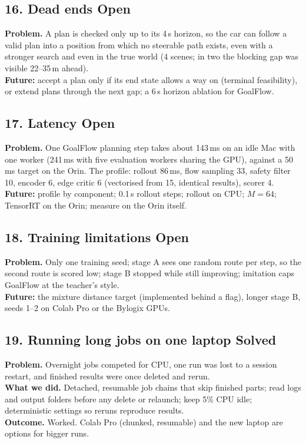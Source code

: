 \documentclass[11pt,a4paper]{article}
\newcommand{\solved}{\textcolor{okc}{\textbf{Solved}}}
\newcommand{\open}{\textcolor{warn}{\textbf{Open}}}
\begin{document}
\subsection*{16. Dead ends \hfill\open}
\textbf{Problem.} A plan is checked only up to its 4\,s horizon, so the car can follow a valid plan into a position
from which no steerable path exists, even with a stronger search and even in the true world (4 scenes; in two the
blocking gap was visible 22--35\,m ahead).\\
\textbf{Future:} accept a plan only if its end state allows a way on (terminal feasibility), or extend plans
through the next gap; a 6\,s horizon ablation for GoalFlow.

\subsection*{17. Latency \hfill\open}
\textbf{Problem.} One GoalFlow planning step takes about 143\,ms on an idle Mac with one worker (241\,ms with five
evaluation workers sharing the GPU), against a 50\,ms target on the Orin. The profile: rollout 86\,ms, flow sampling 33, safety filter 10, encoder 6, edge critic 6 (vectorised from 15,
identical results), scorer 4.\\
\textbf{Future:} profile by component; 0.1\,s rollout steps; rollout on CPU; $M=64$; TensorRT on the Orin; measure
on the Orin itself.

\subsection*{18. Training limitations \hfill\open}
\textbf{Problem.} Only one training seed; stage A sees one random route per step, so the second route is scored
low; stage B stopped while still improving; imitation caps GoalFlow at the teacher's style.\\
\textbf{Future:} the mixture distance target (implemented behind a flag), longer stage B, seeds 1--2 on Colab Pro
or the Bylogix GPUs.

\subsection*{19. Running long jobs on one laptop \hfill\solved}
\textbf{Problem.} Overnight jobs competed for CPU, one run was lost to a session restart, and finished results were
once deleted and rerun.\\
\textbf{What we did.} Detached, resumable job chains that skip finished parts; read logs and output folders before
any delete or relaunch; keep 5\% CPU idle; deterministic settings so reruns reproduce results.\\
\textbf{Outcome.} Worked. Colab Pro (chunked, resumable) and the new laptop are options for bigger runs.
\end{document}

